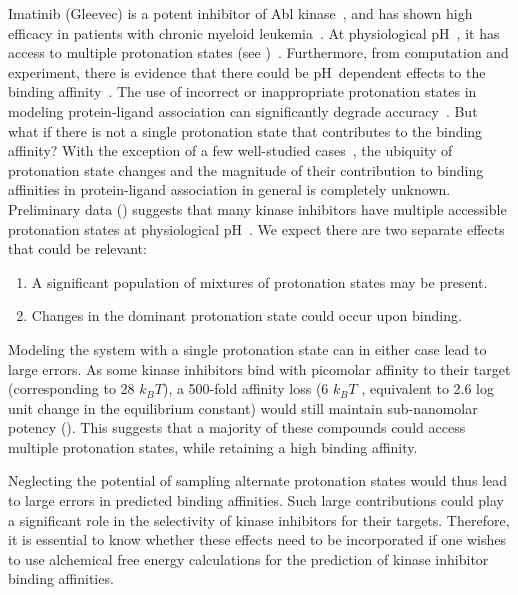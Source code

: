 \documentclass[10pt,final]{article}
\newcommand{\pH}{p$\mathrm{H}$\ }
\begin{document}
Imatinib (Gleevec) is a potent inhibitor of Abl kinase~\autocite{Druker2001a}, and has shown high efficacy in patients with chronic myeloid leukemia~\autocite{OBrien2003a}.
%
At physiological \pH, it has access to multiple protonation states (see )~\autocite{Szakacs2005a}.
%
Furthermore, from computation and experiment, there is evidence that there could be \pH dependent effects to the binding affinity~\autocite{Seeliger2007a,Lin2013a}.
%
The use of incorrect or inappropriate protonation states in modeling protein-ligand association can significantly degrade accuracy~\autocite{Polgar2005a,Wittayanarakul2008a}.
%
But what if there is not a single protonation state that contributes to the binding affinity?
%
With the exception of a few well-studied cases~\autocite{Dullweber2001a,Aleksandrov2007a,Czodrowski2007a,Steuber2007a,Czodrowski2007b}, 
the ubiquity of protonation state changes and the magnitude of their contribution to binding affinities in protein-ligand association in general is completely unknown. 
%
Preliminary data () suggests that many kinase inhibitors have multiple accessible protonation states at physiological \pH.
%
We expect there are two separate effects that could be relevant:
\begin{enumerate}
 \item A significant population of mixtures of protonation states may be present.
 \item Changes in the dominant protonation state could occur upon binding.
\end{enumerate}
%
Modeling the system with a single protonation state can in either case lead to large errors.
%
As some kinase inhibitors bind with picomolar affinity to their target (corresponding to 28 $k_BT$), a 500-fold affinity loss (6 $k_BT$ , equivalent to 2.6 log unit change in the equilibrium constant) would still maintain sub-nanomolar potency ().
%
This suggests that a majority of these compounds could access multiple protonation states, while retaining a high binding affinity.

%
Neglecting the potential of sampling alternate protonation states would thus lead to large errors in predicted binding affinities.
%
Such large contributions could play a significant role in the selectivity of kinase inhibitors for their targets.
%
Therefore, it is essential to know whether these effects need to be incorporated if one wishes to use alchemical free energy calculations for the prediction of kinase inhibitor binding affinities.
\end{document}
